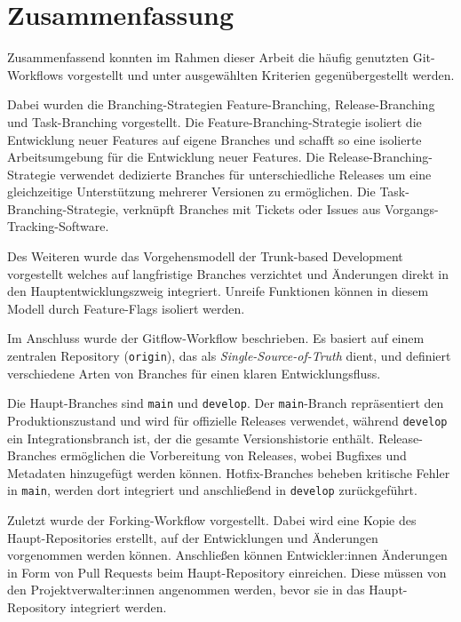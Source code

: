 
\section{Zusammenfassung}
\label{sec:zusammenfassung}

Zusammenfassend konnten im Rahmen dieser Arbeit die häufig genutzten Git\hyp Workflows vorgestellt und unter ausgewählten Kriterien gegenübergestellt werden. 

Dabei wurden die Branching\hyp Strategien Feature\hyp Branching, Release\hyp Branching und Task\hyp Branching vorgestellt. Die Feature\hyp Branching\hyp Strategie isoliert die Entwicklung neuer Features auf eigene Branches und schafft so eine isolierte Arbeitsumgebung für die Entwicklung neuer Features. Die Release\hyp Branching\hyp Strategie verwendet dedizierte Branches für unterschiedliche Releases um eine gleichzeitige Unterstützung mehrerer Versionen zu ermöglichen. Die Task\hyp Branching\hyp Strategie, verknüpft Branches mit Tickets oder Issues aus Vorgangs\hyp Tracking\hyp Software.

Des Weiteren wurde das Vorgehensmodell der Trunk\hyp based Development vorgestellt welches auf langfristige Branches verzichtet und Änderungen direkt in den Hauptentwicklungszweig integriert. Unreife Funktionen können in diesem Modell durch Feature\hyp Flags isoliert werden.

Im Anschluss wurde der Gitflow\hyp Workflow beschrieben. Es basiert auf einem zentralen Repository (\texttt{origin}), das als \emph{Single\hyp Source\hyp of\hyp Truth} dient, und definiert verschiedene Arten von Branches für einen klaren Entwicklungsfluss.

Die Haupt\hyp Branches sind \texttt{main} und \texttt{develop}. Der \texttt{main}-Branch repräsentiert den Produktionszustand und wird für offizielle Releases verwendet, während \texttt{develop} ein Integrationsbranch ist, der die gesamte Versionshistorie enthält. Release\hyp Branches ermöglichen die Vorbereitung von Releases, wobei Bugfixes und Metadaten hinzugefügt werden können. Hotfix\hyp Branches beheben kritische Fehler in \texttt{main}, werden dort integriert und anschließend in \texttt{develop} zurückgeführt.

Zuletzt wurde der Forking\hyp Workflow vorgestellt. Dabei wird eine Kopie des Haupt\hyp Repositories erstellt, auf der Entwicklungen und Änderungen vorgenommen werden können. Anschließen können Entwickler:innen Änderungen in Form von Pull Requests beim Haupt\hyp Repository einreichen. Diese müssen von den Projektverwalter:innen angenommen werden, bevor sie in das Haupt\hyp Repository integriert werden.

